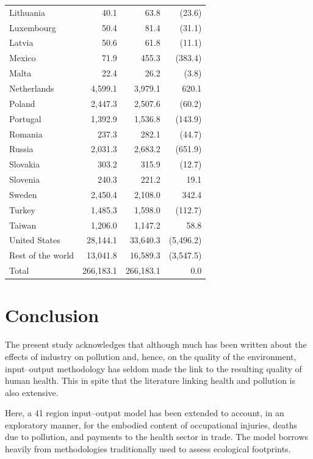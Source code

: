 \documentclass[a4paper,12pt]{article}
\begin{document}
\begin{table}
\begin{center}
\begin{tabular}{lrrr}
Lithuania &  40.1  &  63.8  & (23.6)\\ 
Luxembourg &  50.4  &  81.4  & (31.1)\\ 
Latvia &  50.6  &  61.8  & (11.1)\\ 
Mexico &  71.9  &  455.3  & (383.4)\\ 
Malta &  22.4  &  26.2  & (3.8)\\ 
Netherlands &  4,599.1  &  3,979.1  & 620.1 \\ 
Poland &  2,447.3  &  2,507.6  & (60.2)\\ 
Portugal &  1,392.9  &  1,536.8  & (143.9)\\ 
Romania &  237.3  &  282.1  & (44.7)\\ 
Russia &  2,031.3  &  2,683.2  & (651.9)\\ 
Slovakia &  303.2  &  315.9  & (12.7)\\ 
Slovenia &  240.3  &  221.2  & 19.1 \\ 
Sweden &  2,450.4  &  2,108.0  & 342.4 \\ 
Turkey &  1,485.3  &  1,598.0  & (112.7)\\ 
Taiwan &  1,206.0  &  1,147.2  & 58.8 \\ 
United States &  28,144.1  &  33,640.3  & (5,496.2)\\ 
Rest of the world &  13,041.8  &  16,589.3  & (3,547.5)\\ 
\hline
Total &  266,183.1  &  266,183.1  & 0.0 \\
\hline
\end{tabular}
\label{tab03} 
\end{center}
\end{table}



\section{Conclusion}

The present study acknowledges that although much has been written about the effects of industry on pollution and, hence, on the quality of the environment, input--output methodology has seldom made the link to the resulting quality of human health. This in spite that the literature linking health and pollution is also extensive.

Here, a 41 region input--output model has been extended to account, in an exploratory manner, for the embodied content of occupational injuries, deaths due to pollution, and payments to the health sector in trade. The model borrows heavily from methodologies traditionally used to assess ecological footprints.
\end{document}
